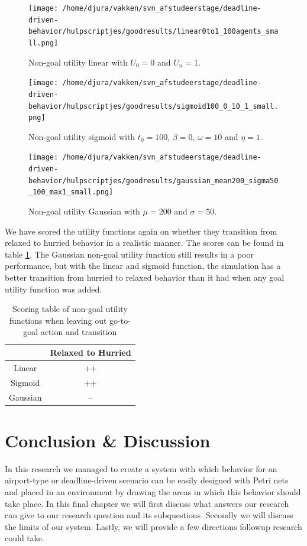 \documentclass[11pt, a4paper]{book}
\begin{document}
\begin{figure}
\centering
\texttt{[image: /home/djura/vakken/svn\_afstudeerstage/deadline-driven-behavior/hulpscriptjes/goodresults/linear0to1\_100agents\_small.png]}
\caption{Non-goal utility linear with $U_0=0$ and $U_n=1$.}
\label{fig:linear0to1_100agents}
\end{figure}

\begin{figure}
\centering
\texttt{[image: /home/djura/vakken/svn\_afstudeerstage/deadline-driven-behavior/hulpscriptjes/goodresults/sigmoid100\_0\_10\_1\_small.png]}
\caption{Non-goal utility sigmoid with $t_0=100$, $\beta=0$, $\omega=10$ and $\eta=1$.}
\label{fig:sigmoid100_0_10_1}
\end{figure}

\begin{figure}
\centering
\texttt{[image: /home/djura/vakken/svn\_afstudeerstage/deadline-driven-behavior/hulpscriptjes/goodresults/gaussian\_mean200\_sigma50\_100\_max1\_small.png]}
\caption{Non-goal utility Gaussian with $\mu=200$ and $\sigma=50$.}
\label{fig:Gaussian_mean200_sigma50_100_max1}
\end{figure}

We have scored the utility functions again on whether they transition from relaxed to hurried behavior in a realistic manner. The scores can be found in table \ref{tab:secondquantitativetable}. The Gaussian non-goal utility function still results in a poor performance, but with the linear and sigmoid function, the simulation has a better transition from hurried to relaxed behavior than it had when any goal utility function was added.

\begin{table}
\centering
\begin{tabular}{|c|c|}
\hline 
 & Relaxed to Hurried\\ 
\hline 
Linear & ++  \\ 
\hline 
Sigmoid & ++  \\ 
\hline 
Gaussian & --\\
\hline
\end{tabular} 
\caption{Scoring table of non-goal utility functions when leaving out go-to-goal action and transition}
\label{tab:secondquantitativetable}
\end{table}

\chapter{Conclusion \& Discussion}
\label{chap:conclusiondiscusssion}
In this research we managed to create a system with which behavior for an airport-type or deadline-driven scenario can be easily designed with Petri nets and placed in an environment by drawing the areas in which this behavior should take place. In this final chapter we will first discuss what answers our research can give to our research question and its subquestions. Secondly we will discuss the limits of our system. Lastly, we will provide a few directions followup research could take.
\end{document}
